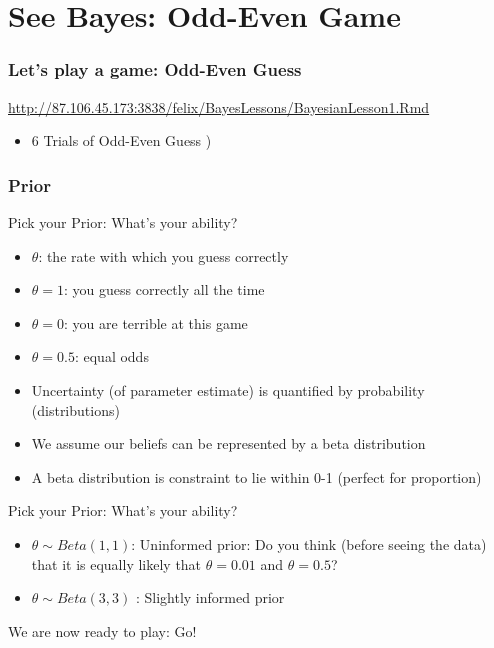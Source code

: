 \documentclass[hyperref={pdfpagelabels=false},unknownkeysallowed]{beamer}
\begin{document}
\section{See Bayes: Odd-Even Game}

\begin{frame}
\frametitle{Let's play a game: Odd-Even Guess}

\url{http://87.106.45.173:3838/felix/BayesLessons/BayesianLesson1.Rmd}

\begin{itemize}
\item 6 Trials of Odd-Even Guess )
\end{itemize} 
\end{frame}

\begin{frame}
\frametitle{Prior}
Pick your Prior: What's your ability? 
\begin{itemize}
\item $\theta$: the rate with which you guess correctly
\item $\theta = 1$: you guess correctly all the time
\item $\theta = 0$: you are terrible at this game
\item $\theta = 0.5$: equal odds
\item Uncertainty (of parameter estimate) is quantified by probability (distributions)
\item We assume our beliefs can be represented by a beta distribution
\item A beta distribution is constraint to lie within 0-1 (perfect for proportion)
\end{itemize}
\note{}
\end{frame}

\begin{frame}
Pick your Prior: What's your ability? 
\begin{itemize}
\item $\theta \sim Beta(1,1)$: Uninformed prior: Do you think (before seeing the data) that it is equally likely that $\theta = 0.01$ and $\theta = 0.5$? 

\item $\theta \sim Beta (3,3)$ : Slightly informed prior
\end{itemize}

We are now ready to play: Go!
\note{}
\end{frame}
\end{document}
